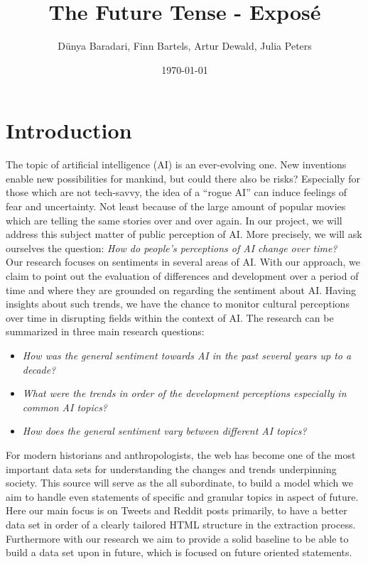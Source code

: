 \documentclass[11pt]{article}
\title{The Future Tense - Exposé}
\author{Dünya Baradari, Finn Bartels, Artur Dewald, Julia Peters}
\date{\today}
\begin{document}
\maketitle
\thispagestyle{empty}


\section{Introduction}
The topic of artificial intelligence (AI) is an ever-evolving one.
New inventions enable new possibilities for mankind, but could there also be risks?
Especially for those which are not tech-savvy, the idea of a “rogue AI” can induce feelings of fear and uncertainty.
Not least because of the large amount of popular movies which are telling the same stories over and over again.
In our project, we will address this subject matter of public perception of AI.
More precisely, we will ask ourselves the question:
\textit{How do people’s perceptions of AI change over time?}
\\
Our research focuses on sentiments in several areas of AI.
With our approach, we claim to point out the evaluation of differences and development over a period of time and where they are grounded on regarding the sentiment about AI.
Having insights about such trends, we have the chance to monitor cultural perceptions over time in disrupting fields within the context of AI.
The research can be summarized in three main research questions:

\begin{itemize}
\item \textit{How was the general sentiment towards AI in the past several years up to a decade?}
\item \textit{What were the trends in order of the development perceptions especially in common AI topics?}
\item \textit{How does the general sentiment vary between different AI topics?}
\end{itemize}
%
For modern historians and anthropologists, the web has become one of the most important data sets for understanding the changes and trends underpinning society.
This source will serve as the all subordinate, to build a model which we aim to handle even statements of specific and granular topics in aspect of future.
Here our main focus is on Tweets and Reddit posts primarily, to have a better data set in order of a clearly tailored HTML structure in the extraction process.
Furthermore with our research we aim to provide a solid baseline to be able to build a data set upon in future, which is focused on future oriented statements.
\end{document}
